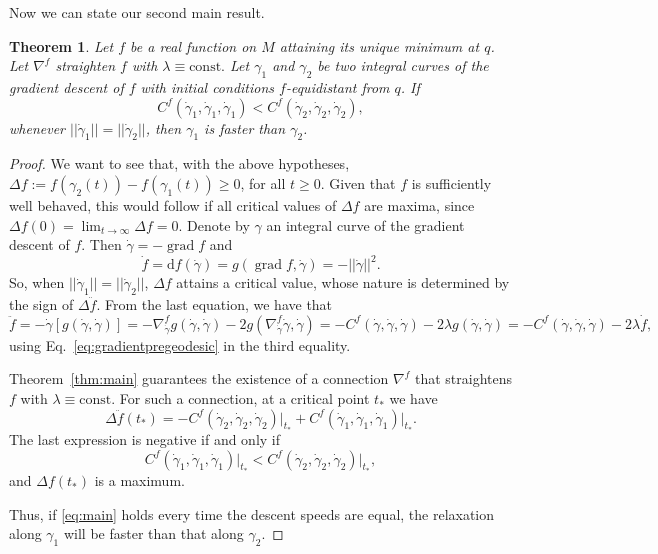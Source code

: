 \documentclass{amsart}
\newtheorem{theorem}{Theorem}[section]
\theoremstyle{definition}
\begin{document}
Now we can state our second main result.

\begin{theorem}\label{thm:asymmetric}
     Let $f$ be a real function on $M$ attaining its unique
     minimum at $q$. Let $\nabla^f$ straighten $f$ with $\lambda\equiv\text{const.}$ 
     Let $\gamma_1$ and $\gamma_2$ be two integral curves of the gradient descent of $f$ 
     with initial conditions $f$-equidistant from $q$.
    If 
    \begin{equation}
        C^f(\dot\gamma_1,\dot\gamma_1,\dot\gamma_1)<C^f (\dot\gamma_2,\dot\gamma_2,\dot\gamma_2),
    \end{equation}
    whenever $||\dot\gamma_1||=||\dot\gamma_2||$,
    then $\gamma_1$ is faster than $\gamma_2$.
\end{theorem}

\begin{proof}
    We want to see that, with the above hypotheses, $\Delta f:=f(\gamma_2(t))-f(\gamma_1(t))\geq0$, for all $t\geq 0$. Given that $f$ is sufficiently well behaved, this would follow if all critical values of $\Delta f$ are maxima, since $\Delta f(0)=\lim_{t\to\infty}\Delta f=0$. 
    Denote by $\gamma$ an integral curve of the gradient descent of $f$. Then $\dot\gamma=-\operatorname{grad}f$ and
    \begin{equation}\label{eq:fdot}
        \dot f=\mathrm{d}f(\dot\gamma)=g(\operatorname{grad}f,\dot\gamma)=-||\dot\gamma||^2.
    \end{equation}
    So, when $||\dot\gamma_1||=||\dot\gamma_2||$, $\Delta f$ attains a critical value, whose nature is determined by the sign of $\Delta\ddot f.$
    From the last equation, we have that
    \begin{equation}
        \ddot f=-\dot\gamma[g(\dot\gamma,\dot\gamma)]=-\nabla^f_{\dot\gamma}g (\dot\gamma,\dot\gamma)-2g(\nabla^f_{\dot\gamma}\dot\gamma,\dot\gamma)=-C^f(\dot\gamma,\dot\gamma,\dot\gamma)-2\lambda g(\dot\gamma,\dot\gamma)=-C^f(\dot\gamma,\dot\gamma,\dot\gamma)-2\lambda \dot f,\label{eq:ddotf}
    \end{equation}
    using Eq.~\eqref{eq:gradientpregeodesic} in the third equality. 
    
    Theorem~\ref{thm:main} guarantees the existence of a connection $\nabla^f$ that straightens $f$ with $\lambda\equiv\text{const.}$ For such a connection, at a critical point $t_*$ we have
    \begin{equation}
    \Delta \ddot f(t_*)=-C^f(\dot\gamma_2, \dot\gamma_2,\dot\gamma_2)\vert_{t_*}+C^f(\dot\gamma_1,\dot\gamma_1,\dot\gamma_1)\vert_{t_*}.
    \end{equation}
    The last expression is negative if and only if
    \begin{equation}
        C^f(\dot\gamma_1,\dot\gamma_1,\dot\gamma_1)\vert_{t_*}<C^f(\dot\gamma_2,\dot\gamma_2,\dot\gamma_2)\vert_{t_*},\label{eq:main}
    \end{equation}
    and $\Delta f(t_*)$ is a maximum.
    
    Thus, if \eqref{eq:main} holds every time the descent speeds are equal, the relaxation along $\gamma_1$ will be faster than that along $\gamma_2$.

\end{proof}
\end{document}
